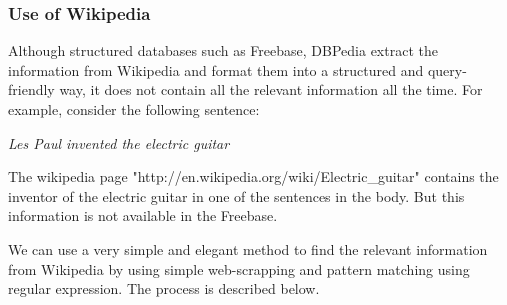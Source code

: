 \documentclass[11pt]{article}
\begin{document}
\subsubsection{Use of Wikipedia}
\label{sec:UseOfWikipedia}
Although structured databases such as Freebase, DBPedia extract the information from Wikipedia and format them into a structured and query-friendly way, it does not contain all the relevant information all the time. For example, consider the following sentence:

\emph{Les Paul invented the electric guitar}

The wikipedia page "http://en.wikipedia.org/wiki/Electric\_guitar" contains the inventor of the electric guitar in one of the sentences in the body. But this information is not available in the Freebase. 

We can use a very simple and elegant method to find the relevant information from Wikipedia by using simple web-scrapping and pattern matching using regular expression. The process is described below.

 

\label{Mar29toApr12}
\end{document}
